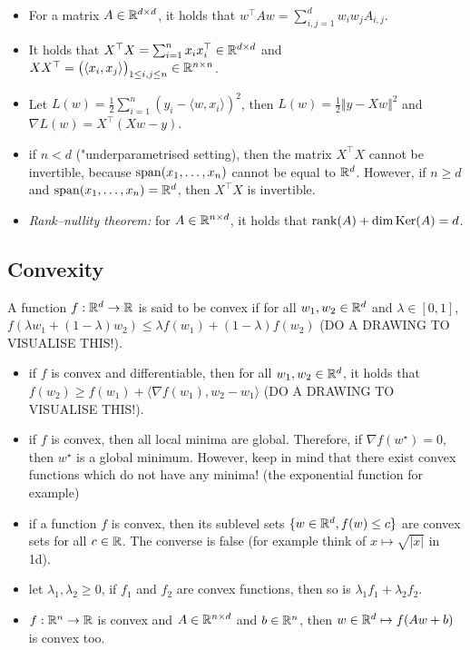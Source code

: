 \begin{itemize}
    \item For a matrix $A \in \mathbb{R}^{d \times d}$, it holds that $w^\top A w = \sum_{i, j = 1}^d w_i w_j A_{i, j}$. 
    \item It holds that $X^\top X = \sum_{i=1}^n x_i x_i^\top \in \mathbb{R}^{d \times d}$ and $X X^\top = \big (\langle x_i, x_j \rangle \big )_{1 \leq i, j \leq n} \in \mathbb{R}^{n \times n}$.
    \item Let $L(w) = \frac{1}{2} \sum_{i = 1}^n (y_i - \langle w, x_i \rangle)^2$, then $L(w) = \frac{1}{2} \Vert y - X w \Vert^2$ and $\nabla L(w) = X^\top (X w - y)$.
    \item if $n < d$ ("underparametrised setting), then the matrix $X^\top X$ cannot be invertible, because $\mathrm{span} (x_1, \dots, x_n)$ cannot be equal to $\mathbb{R}^d$. However, if $n \geq d$ and $\mathrm{span} (x_1, \dots, x_n) = \mathbb{R}^d$, then $X^\top X$ is invertible.
    \item \textit{Rank–nullity theorem:} for $A \in \mathbb{R}^{n \times d}$, it holds that $\rank(A) + \dim \mathrm{Ker}(A) = d$.
\end{itemize}

\subsection{Convexity}

A function $f:\mathbb{R}^d \to \mathbb{R}$ is said to be convex if for all $w_1, w_2 \in \mathbb{R}^d$ and $\lambda \in [0, 1]$, $f(\lambda w_1 + (1 - \lambda) w_2) \leq \lambda f(w_1) + (1 - \lambda) f(w_2)$ (DO A DRAWING TO VISUALISE THIS!). 

\begin{itemize}
    \item if $f$ is convex and differentiable, then for all $w_1, w_2 \in \mathbb{R}^d$, it holds that $f(w_2) \geq f(w_1) + \langle \nabla f(w_1), w_2 - w_1 \rangle$ (DO A DRAWING TO VISUALISE THIS!).
    \item if $f$ is convex, then all local minima are global. Therefore, if $\nabla f(w^\star) = 0$, then $w^\star$ is a global minimum. However, keep in mind that there exist convex functions which do not have any minima! (the exponential function for example)
    \item if a function $f$ is convex, then its sublevel sets $\{ w \in \mathbb{R}^d, f(w) \leq c \}$ are convex sets for all $c \in \mathbb{R}$. The converse is false (for example think of $x \mapsto \sqrt{|x|}$ in 1d).
    \item let $\lambda_1, \lambda_2 \geq 0$, if $f_1$ and $f_2$ are convex functions, then so is $\lambda_1 f_1 + \lambda_2 f_2$.
    \item $f : \mathbb{R}^n \to \mathbb{R}$ is convex and $A \in \mathbb{R}^{n \times d}$ and $b \in \mathbb{R}^n$, then $w \in \mathbb{R}^d \mapsto f(A w + b)$ is convex too. 
\end{itemize}

